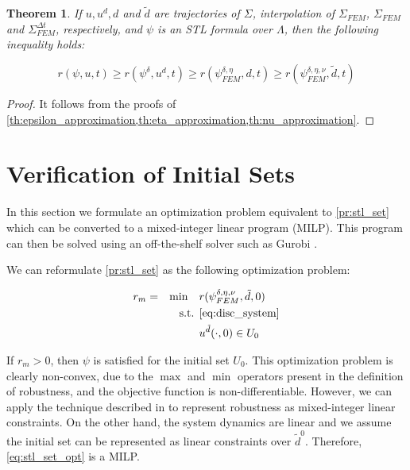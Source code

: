 \documentclass[letterpaper, 10 pt, conference]{ieeeconf/ieeeconf}
\newtheorem{theorem}{Theorem}
\begin{document}
\begin{theorem}
    \label{th:robustness}
    If $u, u^d, d$ and $\tilde{d}$ are trajectories of $\Sigma$, interpolation
    of $\Sigma_{FEM}$, $\Sigma_{FEM}$ and $\Sigma_{FEM}^{\Delta t}$,
    respectively, and $\psi$ is an STL formula over $\Lambda$, then the 
    following inequality holds:

    \begin{equation}
        r(\psi, u, t) \geq r(\psi^{\delta}, u^d, t) \geq r(\psi^{\delta,
        \eta}_{FEM}, d, t) \geq r(\psi^{\delta, \eta, \nu}_{FEM}, \tilde{d}, t)
    \end{equation}
\end{theorem}
\begin{proof}
    It follows from the proofs of
    \cref{th:epsilon_approximation,th:eta_approximation,th:nu_approximation}.
\end{proof}

\section{Verification of Initial Sets}
\label{sec:verification_of_initial_sets}

In this section we formulate an optimization problem equivalent to
\cref{pr:stl_set} which can be converted to a mixed-integer linear program
(MILP). This program can then be solved using an off-the-shelf solver such 
as Gurobi \cite{gurobi}.

We can reformulate \cref{pr:stl_set} as the following optimization problem:

\begin{equation}
    \label{eq:stl_set_opt}
    \begin{aligned}
        &r_m = &\min \quad &r(\psi^{\delta, \eta, \nu}_{FEM}, \tilde{d}, 0) \\
        &  &\text{s.t. } &\cref{eq:disc_system} \\
        &  & &u^{\tilde{d}}(\cdot, 0) \in U_0
    \end{aligned}
\end{equation}

If $r_m > 0$, then $\psi$ is satisfied for the initial set $U_0$. This
optimization problem is clearly non-convex, due to the $\max$ and $\min$
operators present in the definition of robustness, and the objective function is
non-differentiable. However, we can apply the technique described in
\cite{sadraddini_robust_2015} to
represent robustness as mixed-integer linear constraints. On the other hand, the
system dynamics are linear and we assume the initial set can be represented as
linear constraints over $\tilde{d}^0$. Therefore, \cref{eq:stl_set_opt} is a
MILP.
\end{document}
